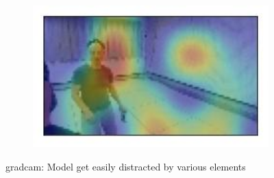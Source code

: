 \begin{figure}[!h]
\begin{center}
\begin{subfigure}[h]{0.24\textwidth}
		\end{subfigure}
		\hfill
		\begin{subfigure}[h]{0.24\textwidth}
			\centering
			\includegraphics[width=1\textwidth]{"contents/images/gradcam/gradcam-random-4"}
		\end{subfigure}
	\end{center}
	\vspace{-0.5cm}
	\caption[\gls{gradcam}: Model get easily distracted by various elements]{\gls{gradcam}: Model get easily distracted by various elements}
	\label{fig:gradcam-random}
\end{figure}

